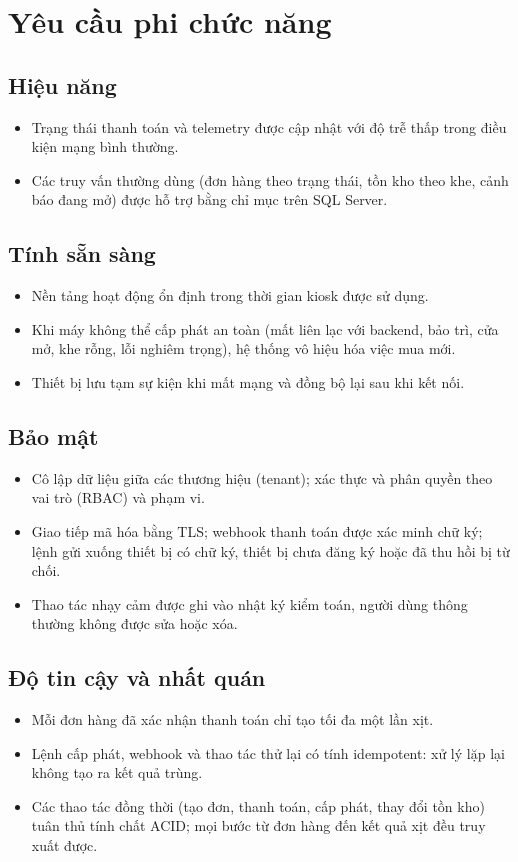 \section{Yêu cầu phi chức năng}

\subsection{Hiệu năng}
\begin{itemize}
  \item Trạng thái thanh toán và telemetry được cập nhật với độ trễ thấp trong điều kiện mạng bình thường.
  \item Các truy vấn thường dùng (đơn hàng theo trạng thái, tồn kho theo khe, cảnh báo đang mở) được hỗ trợ bằng chỉ mục trên SQL Server.
\end{itemize}
\subsection{Tính sẵn sàng}
\begin{itemize}
  \item Nền tảng hoạt động ổn định trong thời gian kiosk được sử dụng.
  \item Khi máy không thể cấp phát an toàn (mất liên lạc với backend, bảo trì, cửa mở, khe rỗng, lỗi nghiêm trọng), hệ thống vô hiệu hóa việc mua mới.
  \item Thiết bị lưu tạm sự kiện khi mất mạng và đồng bộ lại sau khi kết nối.
\end{itemize}
\subsection{Bảo mật}
\begin{itemize}
  \item Cô lập dữ liệu giữa các thương hiệu (tenant); xác thực và phân quyền theo vai trò (RBAC) và phạm vi.
  \item Giao tiếp mã hóa bằng TLS; webhook thanh toán được xác minh chữ ký; lệnh gửi xuống thiết bị có chữ ký, thiết bị chưa đăng ký hoặc đã thu hồi bị từ chối.
  \item Thao tác nhạy cảm được ghi vào nhật ký kiểm toán, người dùng thông thường không được sửa hoặc xóa.
\end{itemize}
\subsection{Độ tin cậy và nhất quán}
\begin{itemize}
  \item Mỗi đơn hàng đã xác nhận thanh toán chỉ tạo tối đa một lần xịt.
  \item Lệnh cấp phát, webhook và thao tác thử lại có tính idempotent: xử lý lặp lại không tạo ra kết quả trùng.
  \item Các thao tác đồng thời (tạo đơn, thanh toán, cấp phát, thay đổi tồn kho) tuân thủ tính chất ACID; mọi bước từ đơn hàng đến kết quả xịt đều truy xuất được.
\end{itemize}
